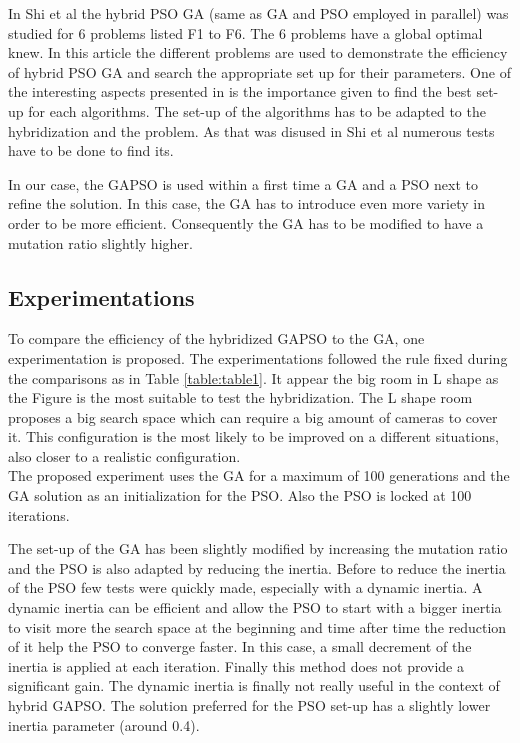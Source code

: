 In Shi et al \cite{77*shi2005} the hybrid PSO GA (same as GA and PSO employed in parallel) was studied for 6  problems listed F1 to F6. The 6 problems have a global optimal knew.  In this article \cite{77*shi2005} the different problems are used to demonstrate the efficiency of hybrid PSO GA and search the appropriate set up for their parameters. One of the interesting aspects presented in \cite{77*shi2005} is the importance given to find  the best set-up for each algorithms. 
The set-up of the algorithms has to be adapted to the hybridization and the problem. As that was disused in Shi et al \cite{77*shi2005} numerous tests have to be done to find its.

 In our case, the GAPSO is used within a first time a GA and a PSO next to refine the solution. In this case, the GA has to introduce even more variety in order to be more efficient. Consequently the GA has to be modified to have a mutation ratio slightly higher.   



\subsection{Experimentations }
To compare the efficiency of the hybridized GAPSO to the GA, one experimentation is proposed.
The experimentations followed the rule fixed during the comparisons as in Table \ref{table:table1}. %
It appear the big room in L shape as the Figure  is the most suitable to test the hybridization.  %
The L shape room proposes a big search space which can require a big amount of cameras to cover it. This configuration is the most likely to be improved on a different situations, also closer to a realistic configuration.\\
The proposed experiment uses the GA for a maximum of 100 generations and the GA solution as an initialization for the PSO. Also the PSO is locked at 100 iterations. %

The set-up of the GA has been slightly modified by increasing the mutation ratio and the PSO is also adapted by reducing the inertia.
 Before to reduce the inertia of the PSO few tests were quickly made, especially with a dynamic inertia. A dynamic inertia can be efficient and allow the PSO to start with a bigger inertia to visit more the search space at the beginning and time after time the reduction of it help the PSO to converge faster. In this case, a small decrement of the inertia is applied at each iteration. Finally this method does not provide a significant gain. The dynamic inertia is finally  not really useful in the context of hybrid GAPSO. The solution  preferred for the PSO set-up has a slightly lower inertia parameter (around 0.4).

